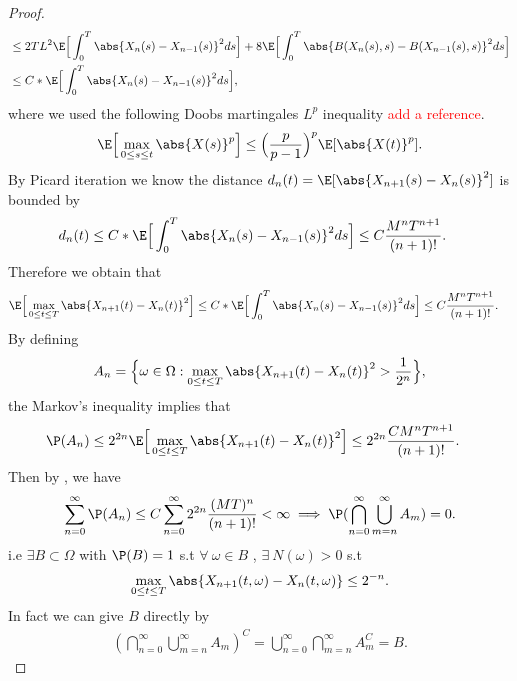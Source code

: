 \begin{proof}
\begin{align*}
    &\le  2TL^2 \E\Big[\int_0^{T} \abs{X_{n}(s) - X_{n-1}(s)  }^2 ds \Big] + 8\E\Big[\int_0^{T} \abs{B(X_{n}(s),s  )-B(X_{n-1}(s),s )}^2 ds \Big]\\
    &\le C*\E\Big[\int_0^{T} \abs{X_{n}(s)-X_{n-1}(s)  }^2 ds \Big]
 ,\end{align*}
where we used the following Doobs martingales $L^{p}$ inequality \textcolor{red}{add a reference}.
  \begin{align*}
    \E\Big[\max_{0\le s\le t} \abs{X(s)}^{p} \Big] \le   \Big(\frac{p}{p-1}\Big)^{p} \E[\abs{X(t)}^{p}  ] 
  .\end{align*}
  By Picard iteration we know the distance $d_{n}(t) = \E[\abs{X_{n+1}(s)-X_{n}(s)  }^2] $ is bounded by 
  \begin{align*}
   d_{n}(t) \leq C*\E\Big[\int_0^{T} \abs{X_{n}(s)-X_{n-1}(s)  }^2 ds \Big] 
                                                     &\le C \frac{M^{n} T^{n+1} }{(n+1)!}
  .\end{align*}
  Therefore we obtain that
\begin{align*}
&\E\Big[\max_{0\le t \le T} \abs{X_{n+1}(t) - X_{n}(t)  }^2\Big]\le C*\E\Big[\int_0^{T} \abs{X_{n}(s)-X_{n-1}(s)  }^2 ds \Big]\le C \frac{M^{n} T^{n+1} }{(n+1)!}
.\end{align*}  
By defining 
$$
A_n=\Big\{\omega\in\Omega:\max_{0\le t\le T} \abs{X_{n+1}(t)-X_n(t)}^2 > \frac{1}{2^{n} }\Big\},
$$
the Markov's inequality implies that
  \begin{align*}
    \P(A_n) &\le 2^{2n} \E\Big[\max_{0\le t\le T} \abs{X_{n+1}(t)-X_n(t)}^2\Big]\le 2^{2n} \frac{CM^{n}T^{n+1}  }{(n+1)!} 
  .\end{align*}
  Then by , we have
  \begin{align*}
    \sum_{n=0}^{\infty} \P(A_n) \le  C \sum_{n=0}^{\infty}2^{2n} \frac{(MT)^{n} }{(n+1)!}    <\infty \implies \P(\bigcap_{n=0}^{\infty} \bigcup_{m=n}^{\infty} A_m ) = 0
   .\end{align*}
   i.e $\exists  B \subset  \Omega  $ with $\P(B) = 1$ s.t $\forall \ \omega  \in  B$ , $\exists \ N(\omega ) > 0 $ s.t
   \begin{align*}
     \max_{0\le t\le T} \abs{X_{n+1}(t,\omega ) - X_{n}(t,\omega )} \le  2^{-n} 
   .\end{align*}
   In fact we can give $B$ directly by 
   \begin{align*}
     \left( \bigcap_{n=0}^{\infty} \bigcup_{m=n}^{\infty} A_m   \right)^{C} = \bigcup_{n=0}^{\infty} \bigcap_{m=n}^{\infty} A_m^{C} = B     
   .\end{align*}

\end{proof}
